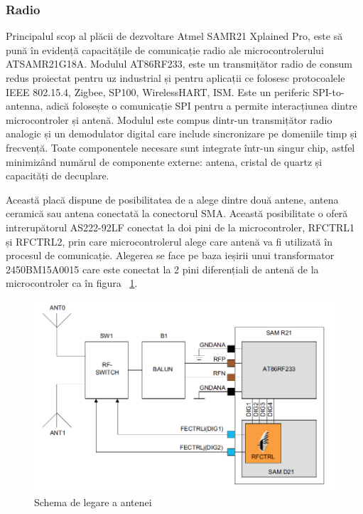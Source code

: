 \documentclass[12pt,a4paper]{report}
\begin{document}
\subsubsection{Radio}
Principalul scop al plăcii de dezvoltare Atmel SAMR21 Xplained Pro, este să pună în evidență capacitățile de comunicație radio ale microcontrolerului ATSAMR21G18A. Modulul AT86RF233, este un transmițător radio de consum redus proiectat pentru uz industrial și pentru aplicații ce folosesc protocoalele IEEE 802.15.4, Zigbee, SP100, WirelessHART, ISM. Este un periferic SPI-to-antenna, adică folosește o comunicație SPI pentru a permite interacțiunea dintre microcontroler și antenă. Modulul este compus dintr-un transmițător radio analogic și un demodulator digital care include sincronizare pe domeniile timp și frecvență. Toate componentele necesare sunt integrate într-un singur chip, astfel minimizând numărul de componente externe: antena, cristal de quartz și capacități de decuplare.

Această placă dispune de posibilitatea de a alege dintre două antene, antena ceramică sau antena conectată la conectorul SMA. Această posibilitate o oferă intrerupătorul AS222-92LF\cite{switch} conectat la doi pini de la microcontroler, RFCTRL1 și RFCTRL2, prin care microcontrolerul alege care antenă va fi utilizată în procesul de comunicație. Alegerea se face pe baza ieșirii unui transformator 2450BM15A0015\cite{balun} care este conectat la 2 pini diferențiali de antenă de la microcontroler ca în figura ~\ref{fig:antena}. \\

\begin{figure}[!htb]
\centering
\includegraphics[scale=0.5]{pics/antena.png}
  \caption{Schema de legare a antenei}
  \label{fig:antena}
\end{figure}
\end{document}
